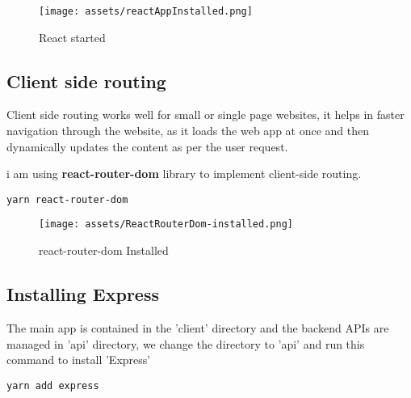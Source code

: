 \documentclass[12pt]{article}
\begin{document}
\begin{figure}[H]
    \centering
    \texttt{[image: assets/reactAppInstalled.png]}
    \caption{React started}
    \label{fig:logo}
\end{figure}


\subsection{Client side routing}
Client side routing works well for small or single page websites, it helps in faster navigation through the website, as it loads the web app at once and then dynamically updates the content as per the user request.

i am using \textbf{react-router-dom} library to implement client-side routing.


\begin{listing}[htbp]
\begin{verbatim}
yarn react-router-dom
\end{verbatim}
\end{listing}



\begin{figure}[H]
    \centering
    \texttt{[image: assets/ReactRouterDom-installed.png]}
    \caption{react-router-dom Installed}
    \label{fig:logo}
\end{figure}


\subsection{Installing Express}

The main app is contained in the 'client' directory and the backend APIs are managed in 'api' directory, we change the directory to 'api' and run this command to install 'Express'

\begin{listing}[htbp]
\begin{verbatim}
yarn add express
\end{verbatim}
\end{listing}

\end{document}
